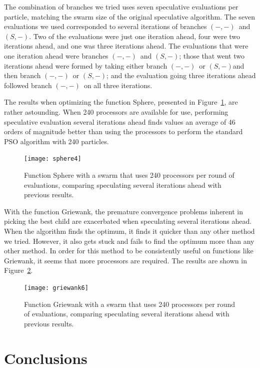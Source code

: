 \documentclass[journal,letterpaper]{IEEEtran}
\newcommand{\fig}[1]{Figure~\ref{fig:#1}}
\providecommand{\casexn}{\ensuremath{(S,-)}}
\providecommand{\casepn}{\ensuremath{(-,-)}}
\begin{document}
The combination of branches we tried uses seven speculative evaluations per
particle, matching the swarm size of the original speculative algorithm.  The
seven evaluations we used corresponded to several iterations of branches
\casepn\ and \casexn.  Two of the evaluations were just one iteration ahead,
four were two iterations ahead, and one was three iterations ahead.  The
evaluations that were one iteration ahead were branches \casepn\ and \casexn;
those that went two iterations ahead were formed by taking either branch
\casepn\ or \casexn and then branch \casepn\ or \casexn; and the evaluation
going three iterations ahead followed branch \casepn\ on all three iterations.

The results when optimizing the function Sphere, presented in
\fig{sphere-manyiters}, are rather astounding.  When 240 processors are
available for use, performing speculative evaluation several iterations ahead
finds values an average of 46 orders of magnitude better than using the
processors to perform the standard PSO algorithm with 240 particles.

\begin{figure}
  \centering
  \texttt{[image: sphere4]}
  \caption{Function Sphere with a swarm that uses 240 processors per round of
  evaluations, comparing speculating several iterations ahead with previous
  results.}
  \label{fig:sphere-manyiters}
\end{figure}

With the function Griewank, the premature convergence problems inherent in
picking the best child are exacerbated when speculating several iterations
ahead.  When the algorithm finds the optimum, it finds it quicker than any
other method we tried.  However, it also gets stuck and fails to find the
optimum more than any other method.  In order for this method to be
consistently useful on functions like Griewank, it seems that more processors
are required.  The results are shown in \fig{griewank-manyiters}.

\begin{figure}
  \centering
  \texttt{[image: griewank6]}
  \caption{Function Griewank with a swarm that uses 240 processors per round of
  evaluations, comparing speculating several iterations ahead with previous
  results.}
  \label{fig:griewank-manyiters}
\end{figure}


\section{Conclusions}
\label{sec:conclusion}
\end{document}
